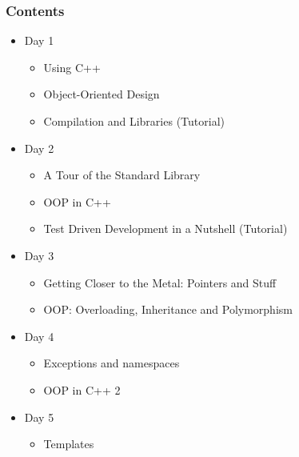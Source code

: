 \documentclass{slides}
\begin{document}
\begin{frame}
  \frametitle{Contents}
  \begin{itemize}
  \item Day 1
    \begin{itemize}
    \item Using C++
    \item Object-Oriented Design
    \item Compilation and Libraries (Tutorial)
    \end{itemize}
  \item Day 2
    \begin{itemize}
    \item A Tour of the Standard Library
    \item OOP in C++
    \item Test Driven Development in a Nutshell (Tutorial)
    \end{itemize}
  \item Day 3
    \begin{itemize}
    \item Getting Closer to the Metal: Pointers and Stuff
    \item OOP: Overloading, Inheritance and Polymorphism 
    \end{itemize}
    \item Day 4
      \begin{itemize}
      \item Exceptions and namespaces
      \item OOP in C++ 2
      \end{itemize}
    \item Day 5
      \begin{itemize}
      \item Templates
      \end{itemize}
  \end{itemize}
\end{frame}
\end{document}
